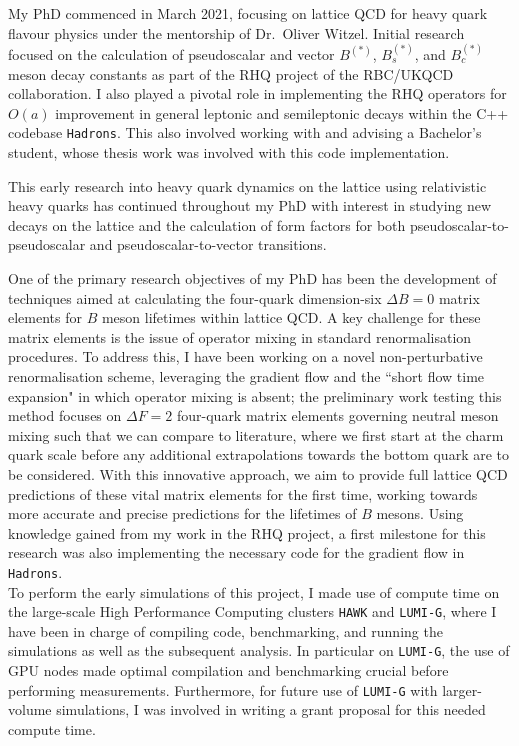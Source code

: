 \documentclass[11pt, a4paper]{awesome-cv}
\begin{document}
\begin{cvletter}
My PhD commenced in March 2021, focusing on lattice QCD for heavy quark flavour physics under the mentorship of Dr.~Oliver Witzel. 
Initial research focused on the calculation of pseudoscalar and vector $B^{(*)}$, $B_s^{(*)}$, and $B_c^{(*)}$ meson decay constants as part of the RHQ project of the RBC/UKQCD collaboration. 
I also played a pivotal role in implementing the RHQ operators for $O(a)$ improvement in general leptonic and semileptonic decays within the C++ codebase {\tt Hadrons}. 
This also involved working with and advising a Bachelor's student, whose thesis work was involved with this code implementation.

This early research into heavy quark dynamics on the lattice using relativistic heavy quarks has continued throughout my PhD with interest in studying new decays on the lattice and the calculation of form factors for both pseudoscalar-to-pseudoscalar and pseudoscalar-to-vector transitions.

One of the primary research objectives of my PhD has been the development of techniques aimed at calculating the four-quark dimension-six $\Delta B=0$ matrix elements for $B$ meson lifetimes within lattice QCD. 
A key challenge for these matrix elements is the issue of operator mixing in standard renormalisation procedures. 
To address this, I have been working on a novel non-perturbative renormalisation scheme, leveraging the gradient flow and the ``short flow time expansion" in which operator mixing is absent; the preliminary work testing this method focuses on $\Delta F=2$ four-quark matrix elements governing neutral meson mixing such that we can compare to literature, where we first start at the charm quark scale before any additional extrapolations towards the bottom quark are to be considered.
With this innovative approach, we aim to provide full lattice QCD predictions of these vital matrix elements for the first time, working towards more accurate and precise predictions for the lifetimes of $B$ mesons.
Using knowledge gained from my work in the RHQ project, a first milestone for this research was also implementing the necessary code for the gradient flow in {\tt Hadrons}.\\
To perform the early simulations of this project, I made use of compute time on the large-scale High Performance Computing clusters {\tt HAWK} and {\tt LUMI-G}, where I have been in charge of compiling code, benchmarking, and running the simulations as well as the subsequent analysis. 
In particular on {\tt LUMI-G}, the use of GPU nodes made optimal compilation and benchmarking crucial before performing measurements.
Furthermore, for future use of {\tt LUMI-G} with larger-volume simulations, I was involved in writing a grant proposal for this needed compute time.


\end{cvletter}
\end{document}
